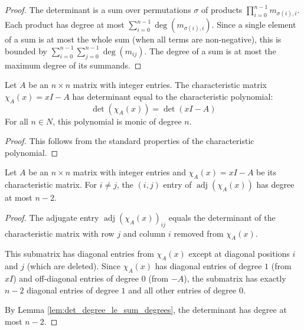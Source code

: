 \begin{proof}
\leanok
The determinant is a sum over permutations $\sigma$ of products $\prod_{i=0}^{n-1} m_{\sigma(i),i}$.
Each product has degree at most $\sum_{i=0}^{n-1} \deg(m_{\sigma(i),i})$.
Since a single element of a sum is at most the whole sum (when all terms are non-negative), 
this is bounded by $\sum_{i=0}^{n-1} \sum_{j=0}^{n-1} \deg(m_{ij})$.
The degree of a sum is at most the maximum degree of its summands.
\end{proof}

\begin{lemma}
\label{lem:charmatrix_helpers}
\leanok
Let $A$ be an $n \times n$ matrix with integer entries. The characteristic matrix $\chi_A(x) = x I - A$ has determinant equal to the characteristic polynomial:
$$\det(\chi_A(x)) = \det(x I - A)$$
For all $n \in N$, this polynomial is monic of degree $n$.
\end{lemma}

\begin{proof}
\leanok
This follows from the standard properties of the characteristic polynomial.
\end{proof}

\begin{lemma}
\label{lem:adj_offdiag_sum_degrees_bound}
\leanok
{}
Let $A$ be an $n \times n$ matrix with integer entries and $\chi_A(x) = x I - A$ be its characteristic matrix.
For $i \neq j$, the $(i,j)$ entry of $\operatorname{adj}(\chi_A(x))$ has degree at most $n-2$.
\end{lemma}

\begin{proof}
\leanok
The adjugate entry $\operatorname{adj}(\chi_A(x))_{ij}$ equals the determinant of the characteristic matrix with row $j$ and column $i$ removed from $\chi_A(x)$.

This submatrix has diagonal entries from $\chi_A(x)$ except at diagonal positions $i$ and $j$ (which are deleted). 
Since $\chi_A(x)$ has diagonal entries of degree $1$ (from $x I$) and off-diagonal entries of degree $0$ (from $-A$), 
the submatrix has exactly $n-2$ diagonal entries of degree $1$ and all other entries of degree $0$.

By Lemma \ref{lem:det_degree_le_sum_degrees}, the determinant has degree at most $n-2$.
\end{proof}

